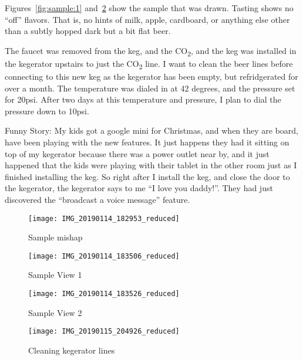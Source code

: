 Figures~\ref{fig:sample:1} and~\ref{fig:sample:2} show the sample that was drawn.  Tasting shows no ``off'' flavors.  That is, no hints of milk, apple, cardboard, or anything else other than a subtly hopped dark but a bit flat beer.

The faucet was removed from the keg, and the CO\textsubscript{2}, and the keg was installed in the kegerator upstairs to just the CO\textsubscript{2} line.  I want to clean the beer lines before connecting to this new keg as the kegerator has been empty, but refridgerated for over a month.  The temperature was dialed in at 42 degrees, and the pressure set for 20psi.  After two days at this temperature and pressure, I plan to dial the pressure down to 10psi.

Funny Story:  My kids got a google mini for Christmas, and when they are board, have been playing with the new features.  It just happens they had it sitting on top of my kegerator because there was a power outlet near by, and it just happened that the kids were playing with their tablet in the other room just as I finished installing the keg.  So right after I install the keg, and close the door to the kegerator, the kegerator says to me ``I love you daddy!''.  They had just discovered the ``broadcast a voice message'' feature.

\begin{figure}[H]
  \centering
  \texttt{[image: IMG\_20190114\_182953\_reduced]}
  \caption{Sample mishap}\label{fig:sample:mishap}
\end{figure}

\begin{figure}[H]
\begin{minipage}{0.45\textwidth}
  \centering
  \texttt{[image: IMG\_20190114\_183506\_reduced]}
  \caption{Sample View 1}\label{fig:sample:1}
\end{minipage}\hfill
\begin{minipage}{0.45\textwidth}
  \centering
  \texttt{[image: IMG\_20190114\_183526\_reduced]}
  \caption{Sample View 2}\label{fig:sample:2}
\end{minipage}
\end{figure}

\FloatBarrier{}
\clearpage

\begin{figure}[H]
  \centering
  \texttt{[image: IMG\_20190115\_204926\_reduced]}
  \caption{Cleaning kegerator lines}\label{fig:cleaning}
\end{figure}

